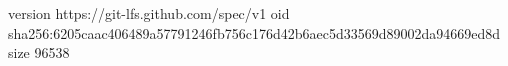 version https://git-lfs.github.com/spec/v1
oid sha256:6205caac406489a57791246fb756c176d42b6aec5d33569d89002da94669ed8d
size 96538
